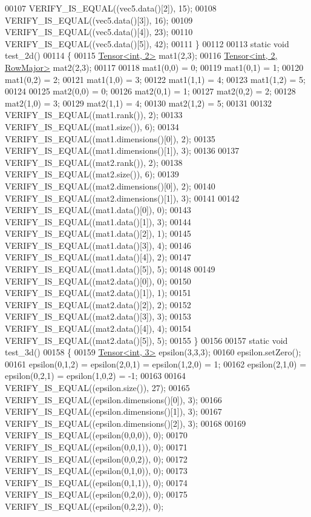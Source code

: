 \begin{DoxyCode}
00107   VERIFY\_IS\_EQUAL((vec5.data()[2]), 15);
00108   VERIFY\_IS\_EQUAL((vec5.data()[3]), 16);
00109   VERIFY\_IS\_EQUAL((vec5.data()[4]), 23);
00110   VERIFY\_IS\_EQUAL((vec5.data()[5]), 42);
00111 \}
00112 
00113 \textcolor{keyword}{static} \textcolor{keywordtype}{void} test\_2d()
00114 \{
00115   \hyperlink{class_eigen_1_1_tensor}{Tensor<int, 2>} mat1(2,3);
00116   \hyperlink{class_eigen_1_1_tensor}{Tensor<int, 2, RowMajor>} mat2(2,3);
00117 
00118   mat1(0,0) = 0;
00119   mat1(0,1) = 1;
00120   mat1(0,2) = 2;
00121   mat1(1,0) = 3;
00122   mat1(1,1) = 4;
00123   mat1(1,2) = 5;
00124 
00125   mat2(0,0) = 0;
00126   mat2(0,1) = 1;
00127   mat2(0,2) = 2;
00128   mat2(1,0) = 3;
00129   mat2(1,1) = 4;
00130   mat2(1,2) = 5;
00131 
00132   VERIFY\_IS\_EQUAL((mat1.rank()), 2);
00133   VERIFY\_IS\_EQUAL((mat1.size()), 6);
00134   VERIFY\_IS\_EQUAL((mat1.dimensions()[0]), 2);
00135   VERIFY\_IS\_EQUAL((mat1.dimensions()[1]), 3);
00136 
00137   VERIFY\_IS\_EQUAL((mat2.rank()), 2);
00138   VERIFY\_IS\_EQUAL((mat2.size()), 6);
00139   VERIFY\_IS\_EQUAL((mat2.dimensions()[0]), 2);
00140   VERIFY\_IS\_EQUAL((mat2.dimensions()[1]), 3);
00141 
00142   VERIFY\_IS\_EQUAL((mat1.data()[0]), 0);
00143   VERIFY\_IS\_EQUAL((mat1.data()[1]), 3);
00144   VERIFY\_IS\_EQUAL((mat1.data()[2]), 1);
00145   VERIFY\_IS\_EQUAL((mat1.data()[3]), 4);
00146   VERIFY\_IS\_EQUAL((mat1.data()[4]), 2);
00147   VERIFY\_IS\_EQUAL((mat1.data()[5]), 5);
00148 
00149   VERIFY\_IS\_EQUAL((mat2.data()[0]), 0);
00150   VERIFY\_IS\_EQUAL((mat2.data()[1]), 1);
00151   VERIFY\_IS\_EQUAL((mat2.data()[2]), 2);
00152   VERIFY\_IS\_EQUAL((mat2.data()[3]), 3);
00153   VERIFY\_IS\_EQUAL((mat2.data()[4]), 4);
00154   VERIFY\_IS\_EQUAL((mat2.data()[5]), 5);
00155 \}
00156 
00157 \textcolor{keyword}{static} \textcolor{keywordtype}{void} test\_3d()
00158 \{
00159   \hyperlink{class_eigen_1_1_tensor}{Tensor<int, 3>} epsilon(3,3,3);
00160   epsilon.setZero();
00161   epsilon(0,1,2) = epsilon(2,0,1) = epsilon(1,2,0) = 1;
00162   epsilon(2,1,0) = epsilon(0,2,1) = epsilon(1,0,2) = -1;
00163 
00164   VERIFY\_IS\_EQUAL((epsilon.size()), 27);
00165   VERIFY\_IS\_EQUAL((epsilon.dimensions()[0]), 3);
00166   VERIFY\_IS\_EQUAL((epsilon.dimensions()[1]), 3);
00167   VERIFY\_IS\_EQUAL((epsilon.dimensions()[2]), 3);
00168 
00169   VERIFY\_IS\_EQUAL((epsilon(0,0,0)), 0);
00170   VERIFY\_IS\_EQUAL((epsilon(0,0,1)), 0);
00171   VERIFY\_IS\_EQUAL((epsilon(0,0,2)), 0);
00172   VERIFY\_IS\_EQUAL((epsilon(0,1,0)), 0);
00173   VERIFY\_IS\_EQUAL((epsilon(0,1,1)), 0);
00174   VERIFY\_IS\_EQUAL((epsilon(0,2,0)), 0);
00175   VERIFY\_IS\_EQUAL((epsilon(0,2,2)), 0);

\end{DoxyCode}

